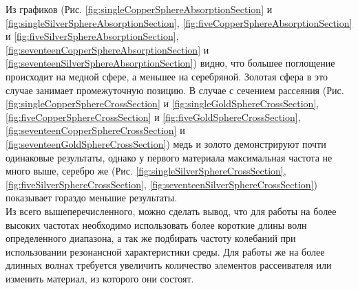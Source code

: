Из графиков (Рис. \ref{fig:singleCopperSphereAbsorptionSection} и \ref{fig:singleSilverSphereAbsorptionSection}, \ref{fig:fiveCopperSphereAbsorptionSection} и \ref{fig:fiveSilverSphereAbsorptionSection}, \ref{fig:seventeenCopperSphereAbsorptionSection} и \ref{fig:seventeenSilverSphereAbsorptionSection}) видно, что большее поглощение происходит на медной сфере, а меньшее на серебряной. Золотая сфера в это случае занимает промежуточную позицию. В случае с сечением рассеяния (Рис. \ref{fig:singleCopperSphereCrossSection} и \ref{fig:singleGoldSphereCrossSection}, \ref{fig:fiveCopperSphereCrossSection} и \ref{fig:fiveGoldSphereCrossSection}, \ref{fig:seventeenCopperSphereCrossSection} и \ref{fig:seventeenGoldSphereCrossSection}) медь и золото демонстрируют почти одинаковые результаты, однако у первого материала максимальная частота не много выше, серебро же (Рис. \ref{fig:singleSilverSphereCrossSection}, \ref{fig:fiveSilverSphereCrossSection}, \ref{fig:seventeenSilverSphereCrossSection}) показывает гораздо меньшие результаты. \\
Из всего вышеперечисленного, можно сделать вывод, что для работы на более высоких частотах необходимо использовать более короткие длины волн определенного диапазона, а так же подбирать частоту колебаний при использовании резонансной характеристики среды. Для работы же на более длинных волнах требуется увеличить количество элементов рассеивателя или изменить материал, из которого они состоят.

